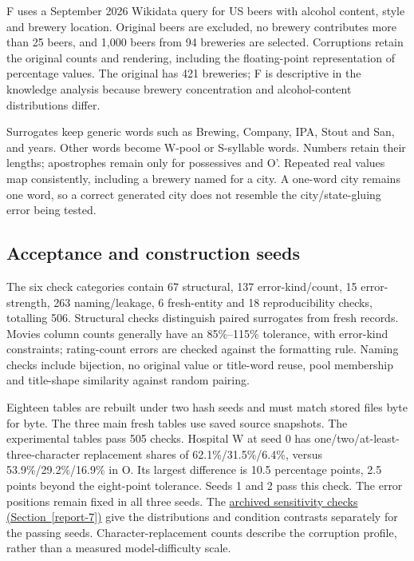 \documentclass[10pt,a4paper]{article}
\begin{document}
F uses a September 2026 Wikidata query for US beers with alcohol content, style and brewery location. Original beers are excluded, no brewery contributes more than 25 beers, and 1,000 beers from 94 breweries are selected. Corruptions retain the original counts and rendering, including the floating-point representation of percentage values. The original has 421 breweries; F is descriptive in the knowledge analysis because brewery concentration and alcohol-content distributions differ.

Surrogates keep generic words such as {\ttfamily\small Brewing}, {\ttfamily\small Company}, {\ttfamily\small IPA}, {\ttfamily\small Stout} and {\ttfamily\small San}, and years. Other words become W-pool or S-syllable words. Numbers retain their lengths; apostrophes remain only for possessives and {\ttfamily\small O'}. Repeated real values map consistently, including a brewery named for a city. A one-word city remains one word, so a correct generated city does not resemble the city/state-gluing error being tested.

\subsection{Acceptance and construction seeds}

The six check categories contain 67 structural, 137 error-kind/count, 15 error-strength, 263 naming/leakage, 6 fresh-entity and 18 reproducibility checks, totalling 506. Structural checks distinguish paired surrogates from fresh records. Movies column counts generally have an 85\%--115\% tolerance, with error-kind constraints; rating-count errors are checked against the formatting rule. Naming checks include bijection, no original value or title-word reuse, pool membership and title-shape similarity against random pairing.

Eighteen tables are rebuilt under two hash seeds and must match stored files byte for byte. The three main fresh tables use saved source snapshots. The experimental tables pass 505 checks. Hospital W at seed 0 has one/two/at-least-three-character replacement shares of 62.1\%/31.5\%/6.4\%, versus 53.9\%/29.2\%/16.9\% in O. Its largest difference is 10.5 percentage points, 2.5 points beyond the eight-point tolerance. Seeds 1 and 2 pass this check. The error positions remain fixed in all three seeds. The \hyperlink{companion-7}{archived sensitivity checks (Section~\ref{report-7})} give the distributions and condition contrasts separately for the passing seeds. Character-replacement counts describe the corruption profile, rather than a measured model-difficulty scale.
\end{document}
